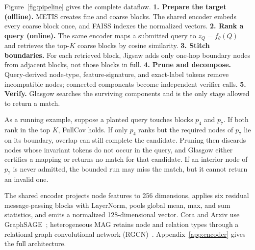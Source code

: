 \documentclass{article}
\begin{document}
Figure~\ref{fig:pipeline} gives the complete dataflow. \textbf{1. Prepare the target (offline).} METIS creates fine and coarse blocks. The shared encoder embeds every coarse block once, and FAISS indexes the normalized vectors. \textbf{2. Rank a query (online).} The same encoder maps a submitted query to $z_Q=f_\theta(Q)$ and retrieves the top-$K$ coarse blocks by cosine similarity. \textbf{3. Stitch boundaries.} For each retrieved block, Jigsaw adds only one-hop boundary nodes from adjacent blocks, not those blocks in full. \textbf{4. Prune and decompose.} Query-derived node-type, feature-signature, and exact-label tokens remove incompatible nodes; connected components become independent verifier calls. \textbf{5. Verify.} Glasgow searches the surviving components and is the only stage allowed to return a match.

As a running example, suppose a planted query touches blocks $p_4$ and $p_7$. If both rank in the top $K$, FullCov holds. If only $p_4$ ranks but the required nodes of $p_7$ lie on its boundary, overlap can still complete the candidate. Pruning then discards nodes whose invariant tokens do not occur in the query, and Glasgow either certifies a mapping or returns no match for that candidate. If an interior node of $p_7$ is never admitted, the bounded run may miss the match, but it cannot return an invalid one.

The shared encoder projects node features to 256 dimensions, applies six residual message-passing blocks with LayerNorm, pools global mean, max, and sum statistics, and emits a normalized 128-dimensional vector. Cora and Arxiv use GraphSAGE~\cite{ref_graphsage}; heterogeneous MAG retains node and relation types through a relational graph convolutional network (RGCN)~\cite{ref_rgcn}. Appendix~\ref{app:encoder} gives the full architecture.
\end{document}
